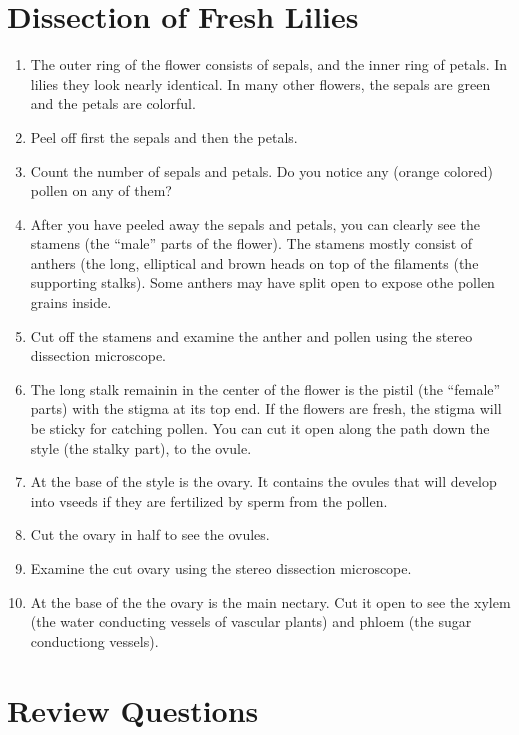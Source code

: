 \documentclass[]{book}
\providecommand{\tightlist}{%
  \setlength{\itemsep}{0pt}\setlength{\parskip}{0pt}}
\begin{document}
\hypertarget{dissection-of-fresh-lilies}{%
\section{Dissection of Fresh Lilies}\label{dissection-of-fresh-lilies}}

\begin{enumerate}
\def\labelenumi{\arabic{enumi}.}
\tightlist
\item
  The outer ring of the flower consists of sepals, and the inner ring of petals. In lilies they look nearly identical. In many other flowers, the sepals are green and the petals are colorful.
\item
  Peel off first the sepals and then the petals.
\item
  Count the number of sepals and petals. Do you notice any (orange colored) pollen on any of them?
\item
  After you have peeled away the sepals and petals, you can clearly see the stamens (the ``male'' parts of the flower). The stamens mostly consist of anthers (the long, elliptical and brown heads on top of the filaments (the supporting stalks). Some anthers may have split open to expose othe pollen grains inside.
\item
  Cut off the stamens and examine the anther and pollen using the stereo dissection microscope.
\item
  The long stalk remainin in the center of the flower is the pistil (the ``female'' parts) with the stigma at its top end. If the flowers are fresh, the stigma will be sticky for catching pollen. You can cut it open along the path down the style (the stalky part), to the ovule.
\item
  At the base of the style is the ovary. It contains the ovules that will develop into vseeds if they are fertilized by sperm from the pollen.
\item
  Cut the ovary in half to see the ovules.
\item
  Examine the cut ovary using the stereo dissection microscope.
\item
  At the base of the the ovary is the main nectary. Cut it open to see the xylem (the water conducting vessels of vascular plants) and phloem (the sugar conductiong vessels).
\end{enumerate}

\hypertarget{review-questions-2}{%
\section{Review Questions}\label{review-questions-2}}
\end{document}
